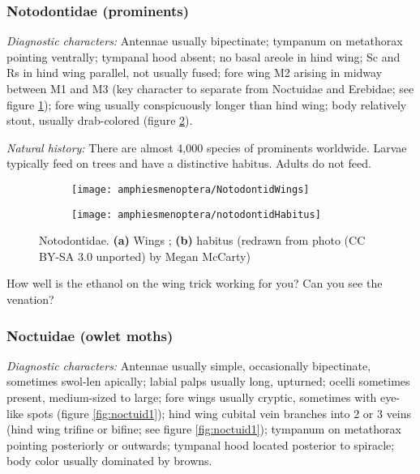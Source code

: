 \subsubsection{Notodontidae (prominents)}%
\noindent{}\textit{Diagnostic characters:} Antennae usually bipectinate; tympanum on metathorax pointing ventrally; tympanal hood absent; no basal areole in hind wing; Sc and Rs in hind wing parallel, not usually fused; fore wing M2 arising in midway between M1 and M3 (key character to separate from Noctuidae and Erebidae; see figure \ref{fig:notodontid1}); fore wing usually conspicuously longer than hind wing; body relatively stout, usually drab-colored (figure \ref{fig:notodontid2}).\vspace{3mm}

\noindent{}\textit{Natural history:} There are almost 4,000 species of prominents worldwide. Larvae typically feed on trees and have a distinctive habitus. Adults do not feed.\vspace{3mm}

\begin{figure}[ht!]
    \centering
    \begin{subfigure}[ht!]{0.32\textwidth}
        \texttt{[image: amphiesmenoptera/NotodontidWings]}
        \caption{}
        \label{fig:notodontid1}
    \end{subfigure}
    \hfill 
    \begin{subfigure}[ht!]{0.5\textwidth}
        \texttt{[image: amphiesmenoptera/notodontidHabitus]}
        \caption{}
        \label{fig:notodontid2}
    \end{subfigure}
    \caption{Notodontidae. \textbf{(a)} Wings \citep[][Fig. 443]{bhlitem16791elementary}; \textbf{(b)} habitus (redrawn from photo (CC BY-SA 3.0 unported) by Megan McCarty)} \label{fig:notodontids}
\end{figure}

\begin{theo}
{}How well is the ethanol on the wing trick working for you? Can you see the venation?
\end{theo} 

\subsubsection{Noctuidae (owlet moths)}
\noindent{}\textit{Diagnostic characters:} Antennae usually simple, occasionally bipectinate, sometimes swol-len apically; labial palps usually long, upturned; ocelli sometimes present, medium-sized to large; fore wings usually cryptic, sometimes with eye-like spots (figure \ref{fig:noctuid1}); hind wing cubital vein branches into 2 or 3 veins (hind wing trifine or bifine; see figure \ref{fig:noctuid1}); tympanum on metathorax pointing posteriorly or outwards; tympanal hood located posterior to spiracle; body color usually dominated by browns.\vspace{3mm}

